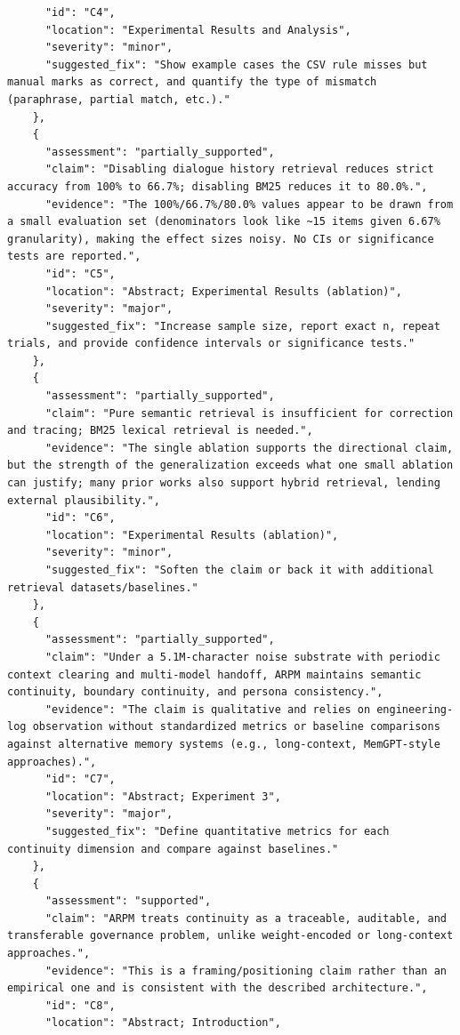 \documentclass[11pt]{article}
\begin{document}
\begin{verbatim}
      "id": "C4",
      "location": "Experimental Results and Analysis",
      "severity": "minor",
      "suggested_fix": "Show example cases the CSV rule misses but manual marks as correct, and quantify the type of mismatch (paraphrase, partial match, etc.)."
    },
    {
      "assessment": "partially_supported",
      "claim": "Disabling dialogue history retrieval reduces strict accuracy from 100% to 66.7%; disabling BM25 reduces it to 80.0%.",
      "evidence": "The 100%/66.7%/80.0% values appear to be drawn from a small evaluation set (denominators look like ~15 items given 6.67% granularity), making the effect sizes noisy. No CIs or significance tests are reported.",
      "id": "C5",
      "location": "Abstract; Experimental Results (ablation)",
      "severity": "major",
      "suggested_fix": "Increase sample size, report exact n, repeat trials, and provide confidence intervals or significance tests."
    },
    {
      "assessment": "partially_supported",
      "claim": "Pure semantic retrieval is insufficient for correction and tracing; BM25 lexical retrieval is needed.",
      "evidence": "The single ablation supports the directional claim, but the strength of the generalization exceeds what one small ablation can justify; many prior works also support hybrid retrieval, lending external plausibility.",
      "id": "C6",
      "location": "Experimental Results (ablation)",
      "severity": "minor",
      "suggested_fix": "Soften the claim or back it with additional retrieval datasets/baselines."
    },
    {
      "assessment": "partially_supported",
      "claim": "Under a 5.1M-character noise substrate with periodic context clearing and multi-model handoff, ARPM maintains semantic continuity, boundary continuity, and persona consistency.",
      "evidence": "The claim is qualitative and relies on engineering-log observation without standardized metrics or baseline comparisons against alternative memory systems (e.g., long-context, MemGPT-style approaches).",
      "id": "C7",
      "location": "Abstract; Experiment 3",
      "severity": "major",
      "suggested_fix": "Define quantitative metrics for each continuity dimension and compare against baselines."
    },
    {
      "assessment": "supported",
      "claim": "ARPM treats continuity as a traceable, auditable, and transferable governance problem, unlike weight-encoded or long-context approaches.",
      "evidence": "This is a framing/positioning claim rather than an empirical one and is consistent with the described architecture.",
      "id": "C8",
      "location": "Abstract; Introduction",

\end{verbatim}
\end{document}
